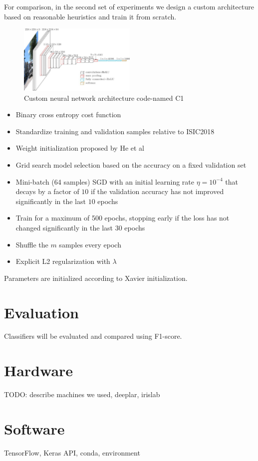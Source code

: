 For comparison, in the second set of experiments we design a custom architecture based on reasonable heuristics and train it from scratch.

\begin{figure}[h]
    \centering
    \includegraphics[width=0.5\textwidth]{figs/vgg16.jpg}
    \caption{Custom neural network architecture code-named C1}
    \label{fig:c1}
\end{figure}

\begin{itemize}
    \item Binary cross entropy cost function
    \item Standardize training and validation samples relative to ISIC2018
    \item Weight initialization proposed by He et al \cite{HeWeightInit}
    \item Grid search model selection based on the accuracy on a fixed validation set
    \item Mini-batch (64 samples) \ac{SGD} with an initial learning rate $\eta = 10^{-4}$ that decays by a factor of $10$ if the validation accuracy has not improved significantly in the last $10$ epochs
    \item Train for a maximum of 500 epochs, stopping early if the loss has not changed significantly in the last $30$ epochs
    \item Shuffle the $m$ samples every epoch
    \item Explicit L2 regularization with $\lambda$
\end{itemize}

Parameters are initialized according to Xavier initialization\cite{xavierinit}.

\section{Evaluation}

Classifiers will be evaluated and compared using F1-score.

\section{Hardware}

TODO: describe machines we used, deeplar, irislab

\section{Software}

TensorFlow, Keras API, conda, environment
